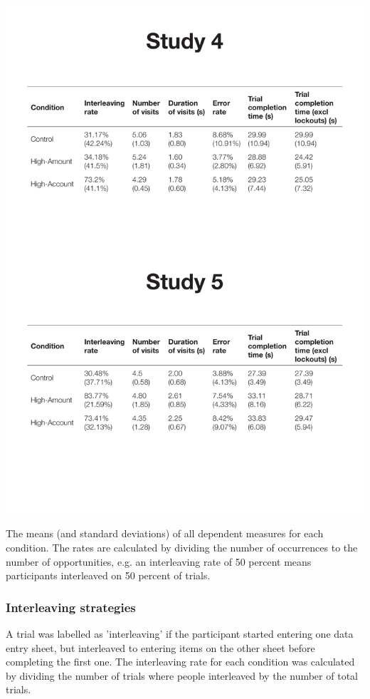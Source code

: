 \begin{table}
 \includegraphics[width=\textwidth]{images/ch34/ch34_5-means.pdf}
\caption{The means (and standard deviations) of all dependent measures for each condition. The rates are calculated by dividing the number of occurrences to the number of opportunities, e.g. an interleaving rate of 50 percent means participants interleaved on 50 percent of trials.}
\label{tbl:ch34_5-means}
\end{table}

\subsubsection{Interleaving strategies}
A trial was labelled as 'interleaving' if the participant started entering one data entry sheet, but interleaved to entering items on the other sheet before completing the first one. The interleaving rate for each condition was calculated by dividing the number of trials where people interleaved by the number of total trials. 

